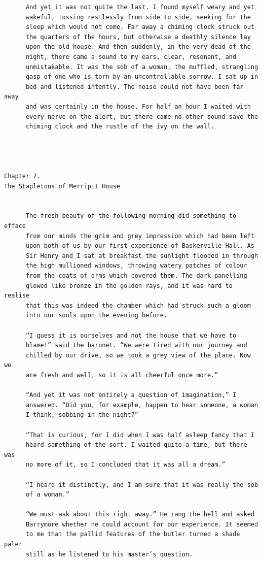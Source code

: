 \documentclass{article}
\begin{document}
\begin{verbatim}
      And yet it was not quite the last. I found myself weary and yet
      wakeful, tossing restlessly from side to side, seeking for the
      sleep which would not come. Far away a chiming clock struck out
      the quarters of the hours, but otherwise a deathly silence lay
      upon the old house. And then suddenly, in the very dead of the
      night, there came a sound to my ears, clear, resonant, and
      unmistakable. It was the sob of a woman, the muffled, strangling
      gasp of one who is torn by an uncontrollable sorrow. I sat up in
      bed and listened intently. The noise could not have been far away
      and was certainly in the house. For half an hour I waited with
      every nerve on the alert, but there came no other sound save the
      chiming clock and the rustle of the ivy on the wall.




Chapter 7.
The Stapletons of Merripit House


      The fresh beauty of the following morning did something to efface
      from our minds the grim and grey impression which had been left
      upon both of us by our first experience of Baskerville Hall. As
      Sir Henry and I sat at breakfast the sunlight flooded in through
      the high mullioned windows, throwing watery patches of colour
      from the coats of arms which covered them. The dark panelling
      glowed like bronze in the golden rays, and it was hard to realise
      that this was indeed the chamber which had struck such a gloom
      into our souls upon the evening before.

      “I guess it is ourselves and not the house that we have to
      blame!” said the baronet. “We were tired with our journey and
      chilled by our drive, so we took a grey view of the place. Now we
      are fresh and well, so it is all cheerful once more.”

      “And yet it was not entirely a question of imagination,” I
      answered. “Did you, for example, happen to hear someone, a woman
      I think, sobbing in the night?”

      “That is curious, for I did when I was half asleep fancy that I
      heard something of the sort. I waited quite a time, but there was
      no more of it, so I concluded that it was all a dream.”

      “I heard it distinctly, and I am sure that it was really the sob
      of a woman.”

      “We must ask about this right away.” He rang the bell and asked
      Barrymore whether he could account for our experience. It seemed
      to me that the pallid features of the butler turned a shade paler
      still as he listened to his master’s question.


\end{verbatim}
\end{document}
